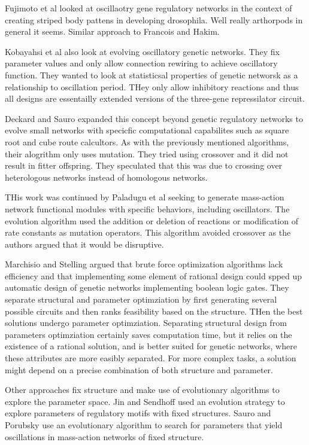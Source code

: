 \documentclass[12pt]{report}
\begin{document}
Fujimoto et al looked at oscillaotry gene regulatory networks in the context of creating striped body pattens in developing drosophila. Well really arthorpods in general it seems. Similar approach to Francois and Hakim.

Kobayahsi et al also look at evolving oscillatory genetic networks. They fix parameter values and only allow connection rewiring to achieve oscillatory function. They wanted to look at statisticsal properties of genetic networsk as a relationship to oscillation period. THey only allow inhibitory reactions and thus all designs are essentailly extended versions of the three-gene repressilator circuit.

Deckard and Sauro expanded this concept beyond genetic regulatory networks to evolve small networks with specicfic computational capabilites such as square root and cube route calcultors. As with the previously mentioned algorithms, their alogrithm only uses mutation. They tried using crossover and it did not result in fitter offspring. They speculated that this was due to crossing over heterologous networks instead of homologous networks.

THis work was continued by Paladugu et al seeking to generate mass-action network functional modules with specific behaviors, including oscillators. The evolution algorithm used the addition or deletion of reactions or modification of rate constants as mutation operators. This algorithm avoided crossover as the authors argued that it would be disruptive.

Marchisio and Stelling argued that brute force optimization algorithms lack efficiency and that implementing some element of rational design could spped up automatic design of genetic networks implementing boolean logic gates. They separate structural and parameter optimziation by first generating several possible circuits and then ranks feasibility based on the structure. THen the best solutions undergo parameter optimziation. Separating structural design from parameters optimziation certainly saves computation time, but it relies on the existence of a rational solution, and is better suited for genetic networks, where these attributes are more easibly separated. For more complex tasks, a solution might depend on a precise combination of both structure and parameter.

Other approaches fix structure and make use of evolutionary algorithms to explore the parameter space. Jin and Sendhoff used an evolution strategy to explore parameters of regulatory motifs with fixed structures. Sauro and Porubsky use an evolutionary algorithm to search for parameters that yield oscillations in mass-action networks of fixed structure.
\end{document}
